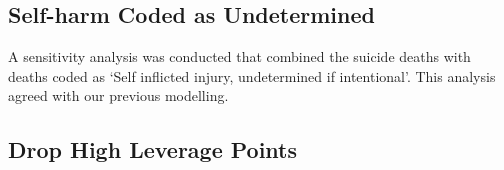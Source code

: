 \documentclass[a4paper]{article}                %
\begin{document}




\subsection{Self-harm Coded as Undetermined}


        A sensitivity analysis was conducted that combined the suicide deaths with deaths coded as `Self inflicted injury, undetermined if intentional'. This analysis agreed with our previous modelling.





\subsection{Drop High Leverage Points}

\end{document}
